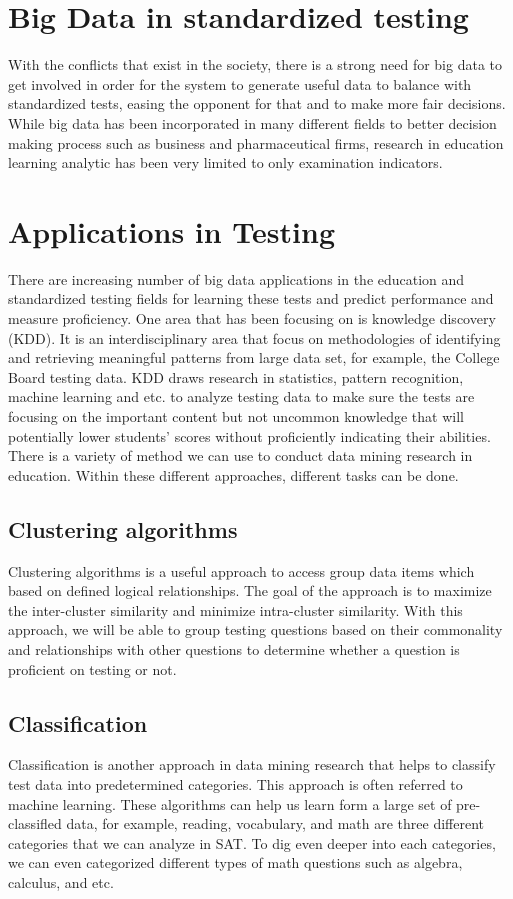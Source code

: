 \documentclass[sigconf]{acmart}
\begin{document}
\section{Big Data in standardized testing}
With the conflicts that exist in the society, there is a strong need for big data to get involved in order for the system to generate useful data to balance with standardized tests, easing the opponent for that and to make more fair decisions. While big data has been incorporated in many different fields to better decision making process such as business and pharmaceutical firms, research in education learning analytic has been very limited to only examination indicators. 

\section{Applications in Testing}
There are increasing number of big data applications in the education and standardized testing fields for learning these tests and predict performance and measure proficiency. One area that has been focusing on is knowledge discovery (KDD). It is an interdisciplinary area that focus on methodologies of identifying and retrieving meaningful patterns from large data set, for example, the College Board  testing data. KDD draws research in statistics, pattern recognition, machine learning and etc. to analyze testing data to make sure the tests are focusing on the important content but not uncommon knowledge that will potentially lower students' scores without proficiently indicating their abilities.\cite{Daniel2015} There is a variety of method we can use to conduct data mining research in education. Within these different approaches, different tasks can be done.

\subsection{Clustering algorithms}
Clustering algorithms is a useful approach to access group data items which based on  defined logical relationships.\cite{Daniel2015} The goal of the approach is to maximize the inter-cluster similarity and minimize intra-cluster similarity. With this approach, we will be able to group testing questions based on their commonality and relationships with other questions to determine whether a question is proficient on testing or not.

\subsection{Classification}
Classification is another approach in data mining research that helps to classify test data into predetermined categories. This approach is often referred to machine learning. These algorithms can help us learn form a large set of pre-classifled data, for example, reading, vocabulary, and math are three different categories that we can analyze in SAT.\cite{Daniel2015} To dig even deeper into each categories, we can even categorized different types of math questions such as algebra, calculus, and etc. 
\end{document}
